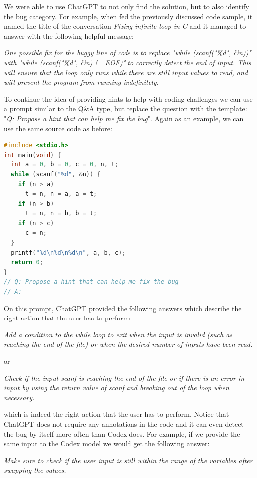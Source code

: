 \documentclass[12pt,a4paper]{report}
\begin{document}
We were able to use ChatGPT to not only find the solution, but to also identify the bug category. For example, when fed the previously discussed code sample, it named the title of the conversation \textit{Fixing infinite loop in C} and it managed to answer with the following helpful message:

\textit{One possible fix for the buggy line of code is to replace "while (scanf("\%d", \&n))" with "while (scanf("\%d", \&n) != EOF)" to correctly detect the end of input. This will ensure that the loop only runs while there are still input values to read, and will prevent the program from running indefinitely.}

To continue the idea of providing hints to help with coding challenges we can use a prompt similar to the Q\&A type, but replace the question with the template: "\textit{Q: Propose a hint that can help me fix the bug}". Again as an example, we can use the same source code as before:

\begin{lstlisting}[language=C++]
#include <stdio.h>
int main(void) {
  int a = 0, b = 0, c = 0, n, t;
  while (scanf("%d", &n)) {
    if (n > a)
      t = n, n = a, a = t;
    if (n > b)
      t = n, n = b, b = t;
    if (n > c)
      c = n;
  }
  printf("%d\n%d\n%d\n", a, b, c);
  return 0;
}
// Q: Propose a hint that can help me fix the bug
// A:
\end{lstlisting}

On this prompt, ChatGPT provided the following answers which describe the right action that the user has to perform:

\textit{Add a condition to the while loop to exit when the input is invalid (such as reaching the end of the file) or when the desired number of inputs have been read.}

or

\textit{Check if the input scanf is reaching the end of the file or if there is an error in input by using the return value of scanf and breaking out of the loop when necessary.}

which is indeed the right action that the user has to perform. Notice that ChatGPT does not require any annotations in the code and it can even detect the bug by itself more often than Codex does. For example, if we provide the same input to the Codex model we would get the following answer:

\textit{Make sure to check if the user input is still within the range of the variables after swapping the values.}
\end{document}
